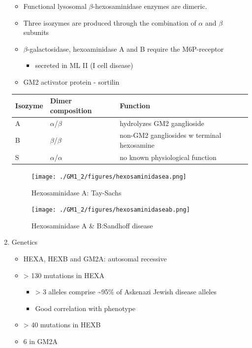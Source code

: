 \documentclass{scrartcl}
\begin{document}
\begin{enumerate}
\begin{itemize}
\item Functional lysosomal \(\beta\)-hexosaminidase enzymes are dimeric.
\item Three isozymes are produced through the combination of \(\alpha\)
and \(\beta\) subunits
\item \(\beta\)-galactosidase, hexoaminidase A and B require the M6P-receptor
\begin{itemize}
\item secreted in ML II (I cell disease)
\end{itemize}
\item GM2 activator protein - sortilin
\end{itemize}

\begin{center}
\begin{tabular}{lll}
Isozyme & Dimer composition & Function\\
\hline
A & \(\alpha\)/\(\beta\) & hydrolyzes GM2 ganglioside\\
B & \(\beta\)/\(\beta\) & non-GM2 gangliosides w terminal hexosamine\\
S & \(\alpha\)/\(\alpha\) & no known physiological function\\
\end{tabular}
\end{center}


\begin{figure}[htbp]
\centering
\texttt{[image: ./GM1\_2/figures/hexosaminidasea.png]}
\caption{\label{fig:org5cba5ff}
Hexosaminidase A: Tay-Sachs}
\end{figure}


\begin{figure}[htbp]
\centering
\texttt{[image: ./GM1\_2/figures/hexosaminidaseab.png]}
\caption{\label{fig:orgc31f773}
Hexosaminidase A \& B:Sandhoff disease}
\end{figure}

\item Genetics
\label{sec:orgd1c1768}
\begin{itemize}
\item HEXA, HEXB and GM2A: autosomal recessive
\item > 130 mutations in HEXA
\begin{itemize}
\item > 3 alleles comprise \textasciitilde{}95\% of Askenazi Jewish disease alleles
\item Good correlation with phenotype
\end{itemize}
\item > 40 mutations in HEXB
\item 6 in GM2A
\end{itemize}


\end{enumerate}
\end{document}
